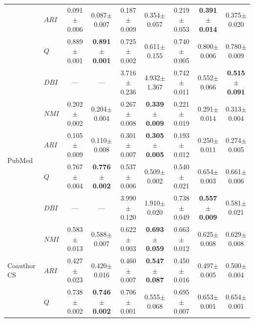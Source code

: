 \documentclass[twoside,twocolumn,10pt]{article}
\begin{document}
\begin{table}[t]
{\begin{tabular}{@{}llccccccc@{}}
 & $ARI$ & 0.091{\scriptsize$\pm$0.006} & 0.087{\scriptsize$\pm$0.007} & 0.187{\scriptsize$\pm$0.009} & 0.354{\scriptsize$\pm$0.057} & 0.219{\scriptsize$\pm$0.053} & \textbf{0.391{\scriptsize$\pm$0.014}} & 0.375{\scriptsize$\pm$0.020} \\
 & $Q$ & 0.889{\scriptsize$\pm$0.001} & \textbf{0.891{\scriptsize$\pm$0.001}} & 0.725{\scriptsize$\pm$0.002} & 0.611{\scriptsize$\pm$0.155} & 0.740{\scriptsize$\pm$0.005} & 0.800{\scriptsize$\pm$0.006} & 0.780{\scriptsize$\pm$0.009} \\
 & $DBI$ & --- & --- & 3.716{\scriptsize$\pm$0.236} & 4.932{\scriptsize$\pm$1.367} & 0.742{\scriptsize$\pm$0.011} & 0.552{\scriptsize$\pm$0.066} & \textbf{0.515{\scriptsize$\pm$0.091}} \\
\midrule
\multirow{4}{*}{PubMed} & $NMI$ & 0.202{\scriptsize$\pm$0.002} & 0.204{\scriptsize$\pm$0.004} & 0.267{\scriptsize$\pm$0.008} & \textbf{0.339{\scriptsize$\pm$0.009}} & 0.221{\scriptsize$\pm$0.019} & 0.291{\scriptsize$\pm$0.014} & 0.313{\scriptsize$\pm$0.004} \\
 & $ARI$ & 0.105{\scriptsize$\pm$0.009} & 0.110{\scriptsize$\pm$0.008} & 0.301{\scriptsize$\pm$0.007} & \textbf{0.305{\scriptsize$\pm$0.005}} & 0.193{\scriptsize$\pm$0.012} & 0.250{\scriptsize$\pm$0.011} & 0.274{\scriptsize$\pm$0.005} \\
 & $Q$ & 0.767{\scriptsize$\pm$0.004} & \textbf{0.776{\scriptsize$\pm$0.002}} & 0.537{\scriptsize$\pm$0.006} & 0.509{\scriptsize$\pm$0.002} & 0.540{\scriptsize$\pm$0.021} & 0.654{\scriptsize$\pm$0.003} & 0.661{\scriptsize$\pm$0.006} \\
 & $DBI$ & --- & --- & 3.990{\scriptsize$\pm$0.120} & 1.910{\scriptsize$\pm$0.020} & 0.738{\scriptsize$\pm$0.049} & \textbf{0.557{\scriptsize$\pm$0.009}} & 0.581{\scriptsize$\pm$0.021} \\
\midrule
\multirow{4}{*}{Coauthor CS} & $NMI$ & 0.583{\scriptsize$\pm$0.013} & 0.588{\scriptsize$\pm$0.007} & 0.622{\scriptsize$\pm$0.003} & \textbf{0.693{\scriptsize$\pm$0.059}} & 0.663{\scriptsize$\pm$0.012} & 0.625{\scriptsize$\pm$0.008} & 0.629{\scriptsize$\pm$0.008} \\
 & $ARI$ & 0.427{\scriptsize$\pm$0.023} & 0.420{\scriptsize$\pm$0.016} & 0.460{\scriptsize$\pm$0.007} & \textbf{0.547{\scriptsize$\pm$0.087}} & 0.450{\scriptsize$\pm$0.016} & 0.497{\scriptsize$\pm$0.005} & 0.500{\scriptsize$\pm$0.004} \\
 & $Q$ & 0.738{\scriptsize$\pm$0.002} & \textbf{0.746{\scriptsize$\pm$0.002}} & 0.706{\scriptsize$\pm$0.001} & 0.555{\scriptsize$\pm$0.068} & 0.695{\scriptsize$\pm$0.007} & 0.653{\scriptsize$\pm$0.001} & 0.654{\scriptsize$\pm$0.001} \\

\end{tabular}}
\end{table}
\end{document}

